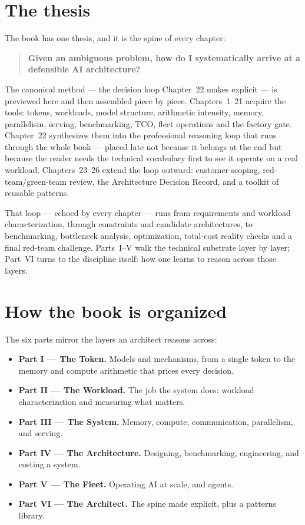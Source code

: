 \section*{The thesis}

The book has one thesis, and it is the spine of every chapter:

\begin{quote}
\textbf{Given an ambiguous problem, how do I systematically arrive at a
defensible AI architecture?}
\end{quote}

The canonical method --- the decision loop Chapter~22 makes explicit --- is
previewed here and then assembled piece by piece. Chapters~1--21 acquire the
tools: tokens, workloads, model structure, arithmetic intensity, memory,
parallelism, serving, benchmarking, TCO, fleet operations and the factory
gate. Chapter~22 synthesizes them into the professional reasoning loop that
runs through the whole book --- placed late not because it belongs at the
end but because the reader needs the technical vocabulary first to see it
operate on a real workload. Chapters~23--26 extend the loop outward:
customer scoping, red-team/green-team review, the Architecture Decision
Record, and a toolkit of reusable patterns.

That loop --- echoed by every chapter --- runs from requirements and
workload characterization, through constraints and candidate architectures,
to benchmarking, bottleneck analysis, optimization, total-cost reality
checks and a final red-team challenge. Parts~I--V walk the technical
substrate layer by layer; Part~VI turns to the discipline itself: how one
learns to reason across those layers.

\section*{How the book is organized}

The six parts mirror the layers an architect reasons across:

\begin{itemize}
  \item \textbf{Part I --- The Token.} Models and mechanisms, from a single
token to the memory and compute arithmetic that prices every decision.
  \item \textbf{Part II --- The Workload.} The job the system does: workload
characterization and measuring what matters.
  \item \textbf{Part III --- The System.} Memory, compute, communication,
parallelism, and serving.
  \item \textbf{Part IV --- The Architecture.} Designing, benchmarking,
engineering, and costing a system.
  \item \textbf{Part V --- The Fleet.} Operating AI at scale, and agents.
  \item \textbf{Part VI --- The Architect.} The spine made explicit, plus a
patterns library.
\end{itemize}

